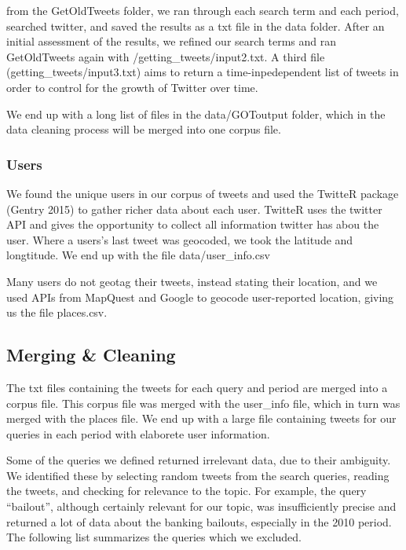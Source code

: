 \documentclass[]{article}
\begin{document}
from the GetOldTweets folder, we ran through each search term and each
period, searched twitter, and saved the results as a txt file in the
data folder. After an initial assessment of the results, we refined our
search terms and ran GetOldTweets again with
/getting\_tweets/input2.txt. A third file (getting\_tweets/input3.txt)
aims to return a time-inpedependent list of tweets in order to control
for the growth of Twitter over time.

We end up with a long list of files in the data/GOToutput folder, which
in the data cleaning process will be merged into one corpus file.

\subsubsection{Users}\label{users}

We found the unique users in our corpus of tweets and used the TwitteR
package (Gentry 2015) to gather richer data about each user. TwitteR
uses the twitter API and gives the opportunity to collect all
information twitter has abou the user. Where a users's last tweet was
geocoded, we took the latitude and longtitude. We end up with the file
data/user\_info.csv

Many users do not geotag their tweets, instead stating their location,
and we used APIs from MapQuest and Google to geocode user-reported
location, giving us the file places.csv.

\subsection{Merging \& Cleaning}\label{merging-cleaning}

The txt files containing the tweets for each query and period are merged
into a corpus file. This corpus file was merged with the user\_info
file, which in turn was merged with the places file. We end up with a
large file containing tweets for our queries in each period with
elaborete user information.

Some of the queries we defined returned irrelevant data, due to their
ambiguity. We identified these by selecting random tweets from the
search queries, reading the tweets, and checking for relevance to the
topic. For example, the query ``bailout'', although certainly relevant
for our topic, was insufficiently precise and returned a lot of data
about the banking bailouts, especially in the 2010 period. The following
list summarizes the queries which we excluded.
\end{document}

